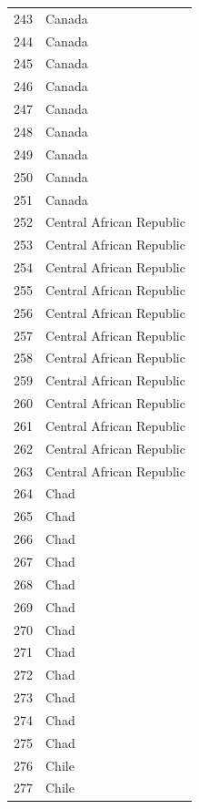 \documentclass[
  letterpaper,
  DIV=11,
  numbers=noendperiod]{scrreprt}
\begin{document}
\begin{tabular}{ll}
243  &                    Canada \\
244  &                    Canada \\
245  &                    Canada \\
246  &                    Canada \\
247  &                    Canada \\
248  &                    Canada \\
249  &                    Canada \\
250  &                    Canada \\
251  &                    Canada \\
252  &  Central African Republic \\
253  &  Central African Republic \\
254  &  Central African Republic \\
255  &  Central African Republic \\
256  &  Central African Republic \\
257  &  Central African Republic \\
258  &  Central African Republic \\
259  &  Central African Republic \\
260  &  Central African Republic \\
261  &  Central African Republic \\
262  &  Central African Republic \\
263  &  Central African Republic \\
264  &                      Chad \\
265  &                      Chad \\
266  &                      Chad \\
267  &                      Chad \\
268  &                      Chad \\
269  &                      Chad \\
270  &                      Chad \\
271  &                      Chad \\
272  &                      Chad \\
273  &                      Chad \\
274  &                      Chad \\
275  &                      Chad \\
276  &                     Chile \\
277  &                     Chile \\

\end{tabular}
\end{document}
